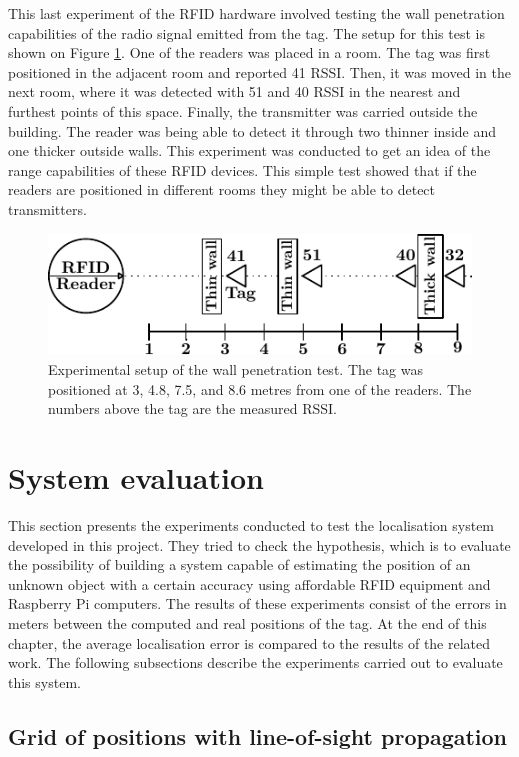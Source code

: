 This last experiment of the RFID hardware involved testing the wall penetration capabilities of the radio signal emitted from the tag. The setup for this test is shown on Figure \ref{fig:pene}. One of the readers was placed in a room. The tag was first positioned in the adjacent room and reported 41 RSSI. Then, it was moved in the next room, where it was detected with 51 and 40 RSSI in the nearest and furthest points of this space. Finally, the transmitter was carried outside the building. The reader was being able to detect it through two thinner inside and one thicker outside walls. This experiment was conducted to get an idea of the range capabilities of these RFID devices. This simple test showed that if the readers are positioned in different rooms they might be able to detect transmitters. 
\begin{figure}[h]
	\begin{center}
		\includegraphics[width=.6\textwidth]{figures/exp/penetration}
		\caption{Experimental setup of the wall penetration test. The tag was positioned at 3, 4.8, 7.5, and 8.6 metres from one of the readers. The numbers above the tag are the measured RSSI.}
		\label{fig:pene}
	\end{center}
\end{figure}


\section{System evaluation}
\label{sec:syseval}

This section presents the experiments conducted to test the localisation system developed in this project. They tried to check the hypothesis, which is to evaluate the possibility of building a system capable of estimating the position of an unknown object with a certain accuracy using affordable RFID equipment and Raspberry Pi computers. The results of these experiments consist of the errors in meters between the computed and real positions of the tag. At the end of this chapter, the average localisation error is compared to the results of the related work. The following subsections describe the experiments carried out to evaluate this system.


\subsection{Grid of positions with line-of-sight propagation}

